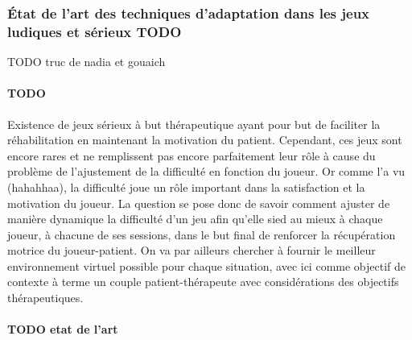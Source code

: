 		\subsubsection{État de l'art des techniques d'adaptation dans les jeux ludiques et sérieux TODO}
		TODO truc de nadia et gouaich
				
			\paragraph{TODO}
Existence de jeux sérieux à but thérapeutique ayant pour but de faciliter la réhabilitation en maintenant la motivation du patient. Cependant, ces jeux sont encore rares et ne remplissent pas encore parfaitement leur rôle à cause du problème de l'ajustement de la difficulté en fonction du joueur.
Or comme l'a vu (hahahhaa), la difficulté joue un rôle important dans la satisfaction et la motivation du joueur. La question se pose donc de savoir comment ajuster de manière dynamique la difficulté d'un jeu afin qu'elle sied au mieux à chaque joueur, à chacune de ses sessions, dans le but final de renforcer la récupération motrice du joueur-patient. On va par ailleurs chercher à fournir le meilleur environnement virtuel possible pour chaque situation, avec ici comme objectif de contexte à terme un couple patient-thérapeute avec considérations des objectifs thérapeutiques. 
			\paragraph{TODO etat de l'art}	